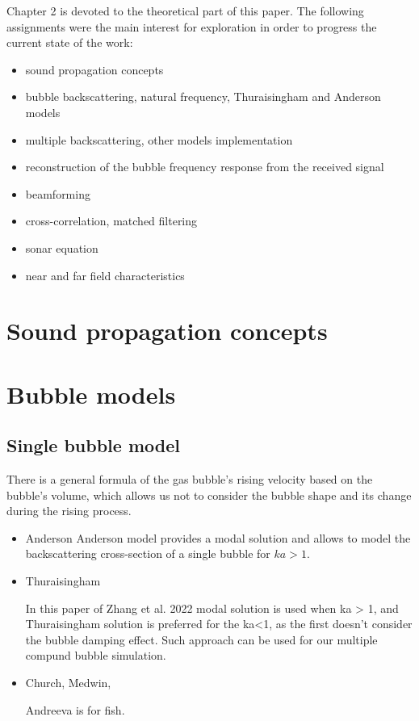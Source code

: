Chapter 2 is devoted to the theoretical part of this paper. The following assignments were the main interest for exploration in order to progress the current state of the work:
\begin{itemize}
    \item sound propagation concepts
    \item bubble backscattering, natural frequency, Thuraisingham and Anderson models
    \item multiple backscattering, other models implementation
    \item reconstruction of the bubble frequency response from the received signal
    \item beamforming
    \item cross-correlation, matched filtering
    \item sonar equation
    \item near and far field characteristics
\end{itemize}
\section{Sound propagation concepts}



\section{Bubble models}
\subsection{Single bubble model}

There is a general formula of the gas bubble's rising velocity based on the bubble's volume, which allows us not to consider the bubble shape and its change during the rising process.


\begin{itemize}
    \item Anderson
    Anderson model provides a modal solution and allows to model the backscattering cross-section of a single bubble for $ka > 1$\cite{anderson_sound_2005}.

    \item Thuraisingham

    In this paper of Zhang et al. 2022\cite{zhang_efficient_2022} modal solution is used when ka > 1, and Thuraisingham solution is preferred for the ka<1, as the first doesn't consider the bubble damping effect.  Such approach can be used for our multiple compund bubble simulation.

    \item Church, Medwin,

    Andreeva is for fish.

\end{itemize}

